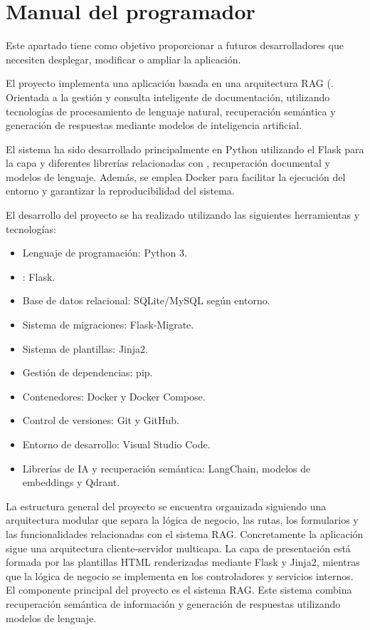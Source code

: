 \section{Manual del programador}
\label{prog:manual}
Este apartado tiene como objetivo proporcionar a futuros desarrolladores que necesiten desplegar, modificar o ampliar la aplicación.

El proyecto implementa una aplicación basada en una arquitectura RAG (. Orientada a la gestión y consulta inteligente de documentación, utilizando tecnologías de procesamiento de lenguaje natural, recuperación semántica y generación de respuestas mediante modelos de inteligencia artificial.

El sistema ha sido desarrollado principalmente en Python utilizando el  Flask para la capa  y diferentes librerías relacionadas con , recuperación documental y modelos de lenguaje. Además, se emplea Docker para facilitar la ejecución del entorno y garantizar la reproducibilidad del sistema.

El desarrollo del proyecto se ha realizado utilizando las siguientes herramientas y tecnologías:
\begin{itemize}
\tightlist
	\item Lenguaje de programación: Python 3.
	\item {} : Flask.
	\item Base de datos relacional: SQLite/MySQL según entorno.
	\item Sistema de migraciones: Flask-Migrate.
	\item Sistema de plantillas: Jinja2.
	\item Gestión de dependencias: pip.
	\item Contenedores: Docker y Docker Compose.
	\item Control de versiones: Git y GitHub.
	\item Entorno de desarrollo: Visual Studio Code.
	\item Librerías de IA y recuperación semántica: LangChain, modelos de embeddings y Qdrant.
\end{itemize}

La estructura general del proyecto se encuentra organizada siguiendo una arquitectura modular que separa la lógica de negocio, las rutas, los formularios y las funcionalidades relacionadas con el sistema RAG. Concretamente la aplicación sigue una arquitectura cliente-servidor multicapa. La capa de presentación está formada por las plantillas HTML renderizadas mediante Flask y Jinja2, mientras que la lógica de negocio se implementa en los controladores y servicios internos. El componente principal del proyecto es el sistema RAG. Este sistema combina recuperación semántica de información y generación de respuestas utilizando modelos de lenguaje.

